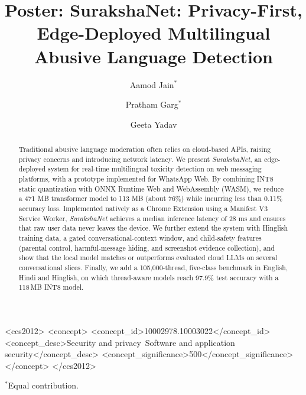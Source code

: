 \documentclass[sigconf,9pt]{acmart}
\begin{document}
\title{Poster: SurakshaNet: Privacy-First, Edge-Deployed Multilingual Abusive Language Detection}

\author{Aamod Jain$^{*}$}
\author{Pratham Garg$^{*}$}
\author{Geeta Yadav}

\begin{abstract}
Traditional abusive language moderation often relies on cloud-based APIs, raising privacy concerns and introducing network latency. We present \textit{SurakshaNet}, an edge-deployed system for real-time multilingual toxicity detection on web messaging platforms, with a prototype implemented for WhatsApp Web. By combining INT8 static quantization with ONNX Runtime Web and WebAssembly (WASM), we reduce a 471 MB transformer model to 113 MB (about 76\%) while incurring less than 0.11\% accuracy loss. Implemented natively as a Chrome Extension using a Manifest V3 Service Worker, \textit{SurakshaNet} achieves a median inference latency of 28 ms and ensures that raw user data never leaves the device. We further extend the system with Hinglish training data, a gated conversational-context window, and child-safety features (parental control, harmful-message hiding, and screenshot evidence collection), and show that the local model matches or outperforms evaluated cloud LLMs on several conversational slices. Finally, we add a 105,000-thread, five-class benchmark in English, Hindi and Hinglish, on which thread-aware models reach 97.9\% test accuracy with a 118\,MB INT8 model.
\end{abstract}

\begin{CCSXML}
<ccs2012>
   <concept>
       <concept_id>10002978.10003022</concept_id>
       <concept_desc>Security and privacy~Software and application security</concept_desc>
       <concept_significance>500</concept_significance>
       </concept>
 </ccs2012>
\end{CCSXML}

\maketitle
\vspace{-0.5em}
$^{*}$Equal contribution.
\end{document}
